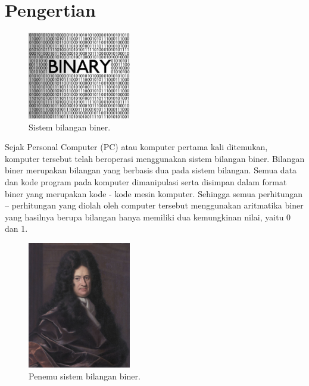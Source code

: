 


%

\section{Pengertian} 

\begin{figure}[ht]
\centerline{\includegraphics[width=0.4\textwidth]{figures/biner.jpg}}
\caption{Sistem bilangan biner.}
\label{biner}
\end{figure}

Sejak Personal Computer (PC) atau komputer pertama kali ditemukan, komputer tersebut telah beroperasi menggunakan sistem bilangan biner. Bilangan biner merupakan bilangan yang berbasis dua pada sistem bilangan. Semua data dan kode program pada komputer dimanipulasi serta disimpan dalam format biner yang merupakan kode - kode mesin komputer. Sehingga semua perhitungan – perhitungan yang diolah oleh computer tersebut menggunakan aritmatika biner yang hasilnya berupa bilangan hanya memiliki dua kemungkinan nilai, yaitu 0 dan 1. 

\begin{figure}[ht]
\centerline{\includegraphics[width=0.4\textwidth]{figures/gwl.jpg}}
\caption{Penemu sistem bilangan biner.}
\label{gwl}
\end{figure}

